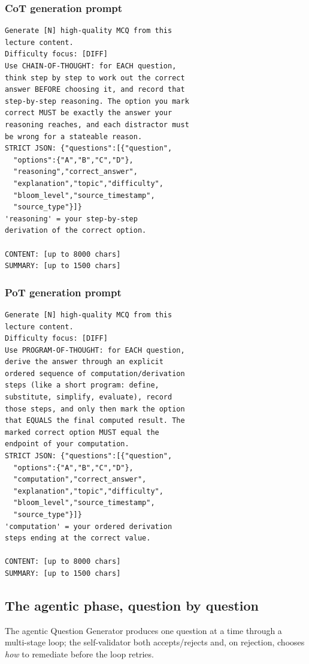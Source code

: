 \subsubsection*{CoT generation prompt}
{\footnotesize
\begin{verbatim}
Generate [N] high-quality MCQ from this
lecture content.
Difficulty focus: [DIFF]
Use CHAIN-OF-THOUGHT: for EACH question,
think step by step to work out the correct
answer BEFORE choosing it, and record that
step-by-step reasoning. The option you mark
correct MUST be exactly the answer your
reasoning reaches, and each distractor must
be wrong for a stateable reason.
STRICT JSON: {"questions":[{"question",
  "options":{"A","B","C","D"},
  "reasoning","correct_answer",
  "explanation","topic","difficulty",
  "bloom_level","source_timestamp",
  "source_type"}]}
'reasoning' = your step-by-step
derivation of the correct option.

CONTENT: [up to 8000 chars]
SUMMARY: [up to 1500 chars]
\end{verbatim}
}

\subsubsection*{PoT generation prompt}
{\footnotesize
\begin{verbatim}
Generate [N] high-quality MCQ from this
lecture content.
Difficulty focus: [DIFF]
Use PROGRAM-OF-THOUGHT: for EACH question,
derive the answer through an explicit
ordered sequence of computation/derivation
steps (like a short program: define,
substitute, simplify, evaluate), record
those steps, and only then mark the option
that EQUALS the final computed result. The
marked correct option MUST equal the
endpoint of your computation.
STRICT JSON: {"questions":[{"question",
  "options":{"A","B","C","D"},
  "computation","correct_answer",
  "explanation","topic","difficulty",
  "bloom_level","source_timestamp",
  "source_type"}]}
'computation' = your ordered derivation
steps ending at the correct value.

CONTENT: [up to 8000 chars]
SUMMARY: [up to 1500 chars]
\end{verbatim}
}

\subsection{The agentic phase, question by question}
\label{sec:bulk-phase}

The agentic Question Generator produces one question at a time through a
multi-stage loop; the self-validator both accepts/rejects and, on rejection,
chooses \emph{how} to remediate before the loop retries.

